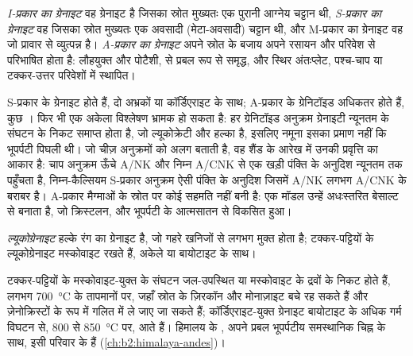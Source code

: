 \begin{definition}[ग्रेनाइट का प्रकार-वर्गीकरण]\label{def:b2:crustal-melting:types}
\emph{I-प्रकार का ग्रेनाइट} वह ग्रेनाइट है जिसका स्रोत मुख्यतः एक
पुरानी आग्नेय चट्टान थी, \emph{S-प्रकार का ग्रेनाइट} वह जिसका स्रोत
मुख्यतः एक अवसादी (मेटा-अवसादी) चट्टान थी, और M-प्रकार का ग्रेनाइट वह जो
प्रावार से व्युत्पन्न है। \emph{A-प्रकार का ग्रेनाइट} अपने स्रोत के बजाय अपने रसायन और
परिवेश से परिभाषित होता है: लौहयुक्त और पोटैशी,  से प्रबल रूप से
समृद्ध, और स्थिर अंतःप्लेट, पश्च-चाप या टक्कर-उत्तर परिवेशों में स्थापित।
\end{definition}

S-प्रकार के ग्रेनाइट  होते हैं, दो अभ्रकों या कॉर्डिएराइट के साथ; A-प्रकार के ग्रेनिटॉइड
अधिकतर  होते हैं, कुछ । फिर भी एक अकेला विश्लेषण भ्रामक हो सकता है: हर
ग्रेनिटॉइड अनुक्रम ग्रेनाइटी न्यूनतम के संघटन के निकट समाप्त होता है, जो ल्यूकोक्रेटी और हल्का
 है, इसलिए  नमूना इसका प्रमाण नहीं कि भूपर्पटी पिघली थी। जो चीज़
अनुक्रमों को अलग बताती है, वह शैंड के आरेख में उनकी प्रवृत्ति का आकार है: चाप अनुक्रम
ऊँचे A/NK और निम्न A/CNK से एक खड़ी पंक्ति के अनुदिश न्यूनतम तक पहुँचता है, निम्न-कैल्सियम S-प्रकार अनुक्रम
ऐसी पंक्ति के अनुदिश जिसमें A/NK लगभग A/CNK के बराबर है। A-प्रकार
मैग्माओं के स्रोत पर कोई सहमति नहीं बनी है: एक मॉडल उन्हें अधःस्तरित बेसाल्ट से बनाता है, जो क्रिस्टलन,
 और भूपर्पटी के आत्मसातन से विकसित हुआ।

\begin{definition}[ल्यूकोग्रेनाइट]\label{def:b2:crustal-melting:leucogranite}
\emph{ल्यूकोग्रेनाइट} हल्के रंग का ग्रेनाइट है, जो गहरे खनिजों से
लगभग मुक्त होता है; टक्कर-पट्टियों के  ल्यूकोग्रेनाइट मस्कोवाइट रखते हैं, अकेले या
बायोटाइट के साथ।
\end{definition}

टक्कर-पट्टियों के मस्कोवाइट-युक्त   के संघटन
जल-उपस्थित या मस्कोवाइट  के द्रवों के निकट होते हैं, लगभग
\qty{700}{\celsius} के तापमानों पर, जहाँ स्रोत के ज़िरकॉन और मोनाज़ाइट बचे रह सकते हैं और ज़ेनोक्रिस्टों के रूप में
गलित में ले जाए जा सकते हैं; कॉर्डिएराइट-युक्त  ग्रेनाइट बायोटाइट के
अधिक गर्म विघटन से, 800 से \qty{850}{\celsius} पर, आते हैं। हिमालय के ,
अपने प्रबल भूपर्पटीय समस्थानिक चिह्न के साथ, इसी परिवार के हैं
(\cref{ch:b2:himalaya-andes})।

